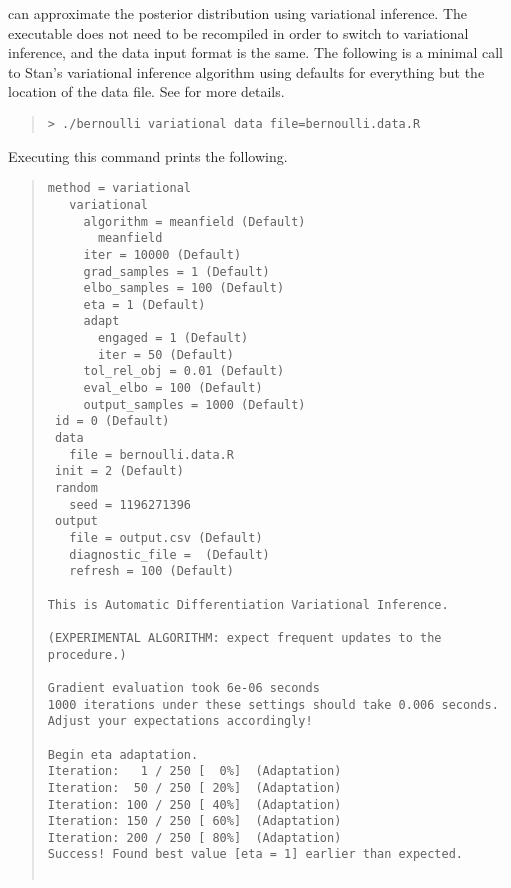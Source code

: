 \CmdStan can approximate the posterior distribution using variational
inference. The executable does not need to be
recompiled in order to switch to variational inference, and the
data input format is the same. The following is a minimal call to
Stan's variational inference algorithm using defaults for everything but the
location of the data file. See  for more
details.
%
\begin{quote}
\begin{Verbatim}[fontshape=sl]
> ./bernoulli variational data file=bernoulli.data.R
\end{Verbatim}
\end{quote}
%
Executing this command prints the following.
%
\begin{quote}
\begin{Verbatim}[fontsize=\footnotesize]
 method = variational
   variational
     algorithm = meanfield (Default)
       meanfield
     iter = 10000 (Default)
     grad_samples = 1 (Default)
     elbo_samples = 100 (Default)
     eta = 1 (Default)
     adapt
       engaged = 1 (Default)
       iter = 50 (Default)
     tol_rel_obj = 0.01 (Default)
     eval_elbo = 100 (Default)
     output_samples = 1000 (Default)
 id = 0 (Default)
 data
   file = bernoulli.data.R
 init = 2 (Default)
 random
   seed = 1196271396
 output
   file = output.csv (Default)
   diagnostic_file =  (Default)
   refresh = 100 (Default)

This is Automatic Differentiation Variational Inference.

(EXPERIMENTAL ALGORITHM: expect frequent updates to the procedure.)

Gradient evaluation took 6e-06 seconds
1000 iterations under these settings should take 0.006 seconds.
Adjust your expectations accordingly!

Begin eta adaptation.
Iteration:   1 / 250 [  0%]  (Adaptation)
Iteration:  50 / 250 [ 20%]  (Adaptation)
Iteration: 100 / 250 [ 40%]  (Adaptation)
Iteration: 150 / 250 [ 60%]  (Adaptation)
Iteration: 200 / 250 [ 80%]  (Adaptation)
Success! Found best value [eta = 1] earlier than expected.


\end{Verbatim}
\end{quote}
